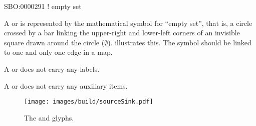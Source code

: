 \begin{glyphDescription}

\glyphSboTerm SBO:0000291 ! empty set

\glyphContainer A  or  is represented by the mathematical symbol for ``empty
set'', that is, a circle crossed by a bar linking the upper-right and
lower-left corners of an invisible square drawn around the circle ($\emptyset$).
 illustrates this.  The symbol should be linked to one
and only one edge in a map.

\glyphLabel A  or  does not carry any labels.

\glyphAux A  or  does not carry any auxiliary items.  

\end{glyphDescription}

\begin{figure}[H]
  \centering
  \texttt{[image: images/build/sourceSink.pdf]}
  \caption{The  and  glyphs.}
  \label{fig:sourceSink}
\end{figure}
